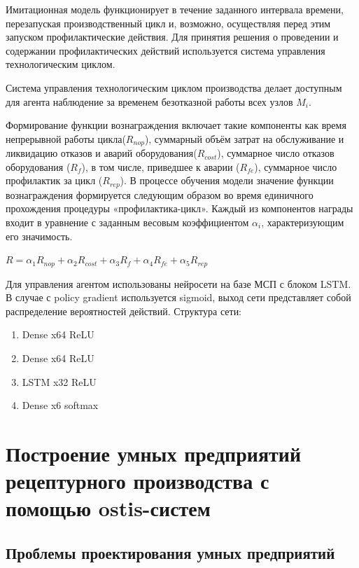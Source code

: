 Имитационная модель функционирует в течение заданного интервала времени, перезапуская производственный цикл и, возможно, осуществляя перед этим запуском профилактические действия. Для принятия решения о проведении и содержании профилактических действий используется система управления технологическим циклом.


Система управления технологическим циклом производства делает доступным для агента наблюдение за временем безотказной работы всех узлов $M_i$.


Формирование функции вознаграждения включает такие компоненты как время непрерывной работы цикла($R_{nop}$), суммарный объём затрат на обслуживание и ликвидацию отказов и аварий оборудования($R_{cost}$), суммарное число отказов оборудования ($R_{f}$), в том числе, приведшее к аварии ($R_{fe}$), суммарное число профилактик за цикл ($R_{rep}$). В процессе обучения модели значение функции вознаграждения формируется следующим образом во время единичного прохождения процедуры «профилактика-цикл». Каждый из компонентов награды входит в уравнение с заданным весовым коэффициентом $\alpha_i$, характеризующим его значимость.


$R=\alpha_1 R_{nop}+\alpha_2 R_{cost}+\alpha_3 R_{f}+\alpha_4 R_{fe}+\alpha_5 R_{rep}$

Для управления агентом использованы нейросети на базе МСП с блоком LSTM. В случае с policy gradient используется sigmoid, выход сети представляет собой распределение вероятностей действий.
Структура сети:

\begin{enumerate}
    \item Dense x64 ReLU
    \item Dense x64 ReLU
    \item LSTM x32 ReLU
    \item Dense x6 softmax

\end{enumerate}




\section{Построение умных предприятий рецептурного производства с помощью ostis-систем}


\subsection{Проблемы проектирования умных предприятий}


